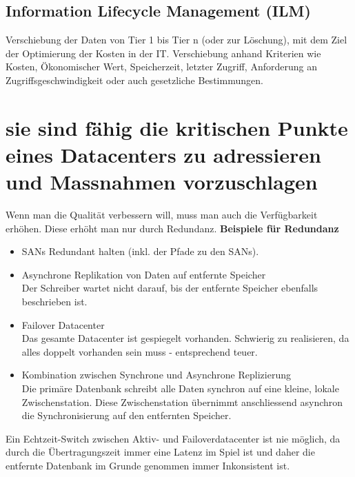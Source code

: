 \subsection{Information Lifecycle Management (ILM)}
Verschiebung der Daten von Tier 1 bis Tier n (oder zur Löschung), mit dem Ziel der Optimierung der Kosten in der IT. Verschiebung anhand Kriterien wie Kosten, Ökonomischer Wert, Speicherzeit, letzter Zugriff, Anforderung an Zugriffsgeschwindigkeit oder auch gesetzliche Bestimmungen.
\section{sie sind fähig die kritischen Punkte eines Datacenters zu adressieren und Massnahmen vorzuschlagen}
Wenn man die Qualität verbessern will, muss man auch die Verfügbarkeit erhöhen. Diese erhöht man nur durch Redundanz.
\textbf{Beispiele für Redundanz}
\begin{itemize}
	\item SANs Redundant halten (inkl. der Pfade zu den SANs).
	\item Asynchrone Replikation von Daten auf entfernte Speicher \\
		Der Schreiber wartet nicht darauf, bis der entfernte Speicher ebenfalls beschrieben ist.
	\item Failover Datacenter \\ 
		Das gesamte Datacenter ist gespiegelt vorhanden. Schwierig zu realisieren, da alles doppelt vorhanden sein muss - entsprechend teuer.
	\item Kombination zwischen Synchrone und Asynchrone Replizierung \\
		Die primäre Datenbank schreibt alle Daten synchron auf eine kleine, lokale Zwischenstation. Diese Zwischenstation übernimmt anschliessend asynchron die Synchronisierung auf den entfernten Speicher.
\end{itemize}
Ein Echtzeit-Switch zwischen Aktiv- und Failoverdatacenter ist nie möglich, da durch die Übertragungszeit immer eine Latenz im Spiel ist und daher die entfernte Datenbank im Grunde genommen immer Inkonsistent ist.